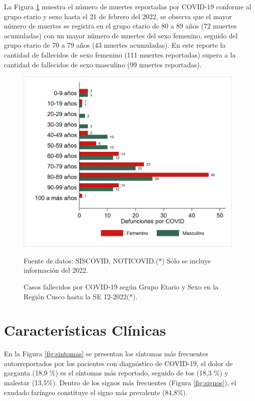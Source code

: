 \documentclass[12pt,a4paper,openany]{book}
\begin{document}
La Figura \ref{fig:fallecidos_edad_sexo}  muestra el número de muertes reportadas por COVID-19 conforme al grupo etario y sexo hasta el 21 de febrero del 2022, se observa que el mayor número de muertes se registra en el grupo etario de 80 a 89 años (72 muertes acumuladas) con un mayor número de muertes del sexo femenino, seguido del grupo etario de 70 a 79 años (43 muertes acumuladas). En este reporte la cantidad de fallecidos de sexo femenino (111 muertes reportadas) supera a la cantidad de fallecidos de sexo masculino (99 muertes reportadas). 

\begin{figure}[h]
	\caption{Casos fallecidos por COVID-19 según Grupo Etario y Sexo en la Región Cusco hasta la SE 12-2022(*).}\label{fig:fallecidos_edad_sexo}
	\begin{center}
		\includegraphics[width=0.75\linewidth]{../figuras/defunciones_etapavida_2022}
	\end{center}
	{\footnotesize {Fuente de datos: SISCOVID, NOTICOVID.(*) Sólo se incluye información del 2022.}}
\end{figure}



\cleardoublepage


\clearpage

\section*{Características Clínicas}
\noindent En la Figura \ref{fig:sintomas} se presentan los síntomas más frecuentes autorreportados por los pacientes con diagnóstico de COVID-19, el dolor de garganta (18,9 $\%$) es el síntomas más reportado, seguido de tos (18,3 $\%$) y malestar (13,5$\%$). Dentro de los signos más frecuentes (Figura \ref{fig:signos}), el exudado faríngeo constituye el signo más prevalente (84,8$\%$). 
\end{document}

